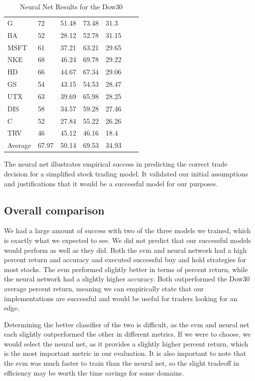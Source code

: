 \documentclass{article}
\begin{document}
\begin{table}[h!]
\begin{tabular}{@{}lllllll@{}}
    G & 72 & 51.48 & 73.48 & 31.3 & \\
    BA & 52 & 28.12 & 52.78 & 31.15 & \\
    MSFT & 61 & 37.21 & 63.21 & 29.65 & \\
    NKE & 68 & 46.24 & 69.78 & 29.22 & \\
    HD & 66 & 44.67 & 67.34 & 29.06 & \\
    GS & 54 & 43.15 & 54.53 & 28.47 & \\
    UTX & 63 & 39.69 & 65.98 & 28.25 & \\
    DIS & 58 & 34.57 & 59.28 & 27.46 & \\
    C & 52 & 27.84 & 55.22 & 26.26 & \\
    TRV & 46 & 45.12 & 46.16 & 18.4 & \\ \bottomrule
    Average & 67.97 & 50.14 & 69.53 & 34.93 & \\
  \end{tabular}
  \caption{Neural Net Results for the Dow30}
  \label{my-label}
\end{table}

The neural net illustrates empirical success in predicting the correct trade decision for a simplified stock trading model. It validated our initial assumptions and justifications that it would be a successful model for our purposes.

\subsection{Overall comparison}
We had a large amount of success with two of the three models we trained, which is exactly what we expected to see. We did not predict that our successful models would perform as well as they did. Both the svm and neural network had a high percent return and accuracy and executed successful buy and hold strategies for most stocks. The svm performed slightly better in terms of percent return, while the neural network had a slightly higher accuracy. Both outperformed the Dow30 average percent return, meaning we can empirically state that our implementations are successful and would be useful for traders looking for an edge.

Determining the better classifier of the two is difficult, as the svm and neural net each slightly outperformed the other in different metrics. If we were to choose, we would select the neural net, as it provides a slightly higher percent return, which is the most important metric in our evaluation. It is also important to note that the svm was much faster to train than the neural net, so the slight tradeoff in efficiency may be worth the time savings for some domains.
\end{document}
